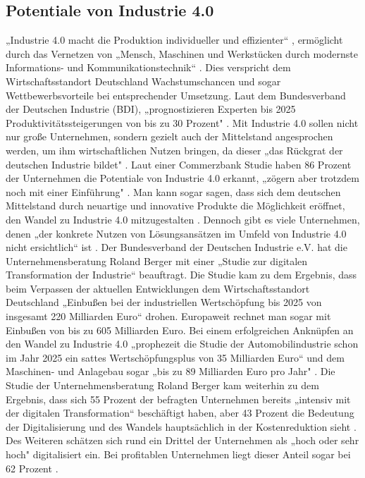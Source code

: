 \subsection{Potentiale von Industrie 4.0}\label{sec:PotentialeIndustrie4.0}
„Industrie 4.0 macht die Produktion individueller und effizienter“ \cite{6}, ermöglicht durch das Vernetzen von „Mensch, Maschinen und Werkstücken durch modernste Informations- und Kommunikationstechnik“ \cite{6}. Dies verspricht dem Wirtschaftsstandort Deutschland Wachstumschancen und sogar Wettbewerbsvorteile bei entsprechender Umsetzung. Laut dem Bundesverband der Deutschen Industrie (BDI), „prognostizieren Experten bis 2025 Produktivitätssteigerungen von bis zu 30 Prozent" \cite{6}.
\newline
Mit Industrie 4.0 sollen nicht nur große Unternehmen, sondern gezielt auch der Mittelstand angesprochen werden, um ihm wirtschaftlichen Nutzen bringen, da dieser „das Rückgrat der deutschen Industrie bildet" \cite[S.4]{2}. Laut einer Commerzbank Studie haben 86 Prozent der Unternehmen die Potentiale von Industrie 4.0 erkannt, „zögern aber trotzdem noch mit einer Einführung" \cite[S.4]{2}. Man kann sogar sagen, dass sich dem deutschen Mittelstand durch neuartige und innovative Produkte die Möglichkeit eröffnet, den Wandel zu Industrie 4.0 mitzugestalten \cite[S.8]{2}. Dennoch gibt es viele Unternehmen, denen „der konkrete Nutzen von Lösungsansätzen im Umfeld von Industrie 4.0 nicht ersichtlich“ ist \cite[S.7]{2}. 
\newline
Der Bundesverband der Deutschen Industrie e.V. hat die Unternehmensberatung Roland Berger mit einer „Studie zur digitalen Transformation der Industrie“ \cite{8} beauftragt. Die Studie kam zu dem Ergebnis, dass beim Verpassen der aktuellen Entwicklungen dem Wirtschaftsstandort Deutschland „Einbußen bei der industriellen Wertschöpfung bis 2025 von insgesamt 220 Milliarden Euro“ \cite{8} drohen. Europaweit rechnet man sogar mit Einbußen von bis zu 605 Milliarden Euro. Bei einem erfolgreichen Anknüpfen an den Wandel zu Industrie 4.0 „prophezeit die Studie der Automobilindustrie schon im Jahr 2025 ein sattes Wertschöpfungsplus von 35 Milliarden Euro“ \cite{8} und dem Maschinen- und Anlagebau sogar „bis zu 89 Milliarden Euro pro Jahr" \cite{8}. Die Studie der Unternehmensberatung Roland Berger kam weiterhin zu dem Ergebnis, dass sich 55 Prozent der befragten Unternehmen bereits „intensiv mit der digitalen Transformation“ \cite{8} beschäftigt haben, aber 43 Prozent die Bedeutung der Digitalisierung und des Wandels hauptsächlich in der Kostenreduktion sieht \cite{8}. Des Weiteren schätzen sich rund ein Drittel der Unternehmen als „hoch oder sehr hoch" \cite{8} digitalisiert ein. Bei profitablen Unternehmen liegt dieser Anteil sogar bei 62 Prozent \cite{8}.
